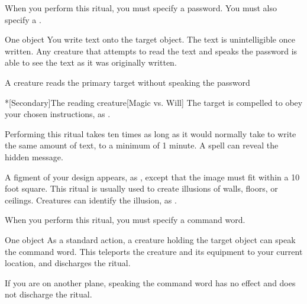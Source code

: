 \spellspecial When you perform this ritual, you must specify a password. You must also specify a .
\begin{spelltarget}[Primary]{One object}
    \spelleffect You write text onto the target object. The text is unintelligible once written. Any creature that attempts to read the text and speaks the password is able to see the text as it was originally written.
\end{spelltarget}
\begin{spelltrigger}{A creature reads the primary target without speaking the password}
    \begin{spelltarget}*[Secondary]{The reading creature}[Magic vs. Will]
        \spellsuccess The target is compelled to obey your chosen instructions, as .
    \end{spelltarget}
\end{spelltrigger}
\spellnotes Performing this ritual takes ten times as long as it would normally take to write the same amount of text, to a minimum of 1 minute. A  spell can reveal the hidden message.

\spellrng{\rngclose}
\spellline
\spelleffect A figment of your design appears, as , except that the image must fit within a 10 foot square.
\spellnotes This ritual is usually used to create illusions of walls, floors, or ceilings. Creatures can identify the illusion, as .

\spellspecial When you perform this ritual, you must specify a command word.
\begin{spelltarget}{One object}
    \spelleffect As a standard action, a creature holding the target object can speak the command word. This teleports the creature and its equipment to your current location, and discharges the ritual.
\end{spelltarget}
\spellnotes If you are on another plane, speaking the command word has no effect and does not discharge the ritual.


